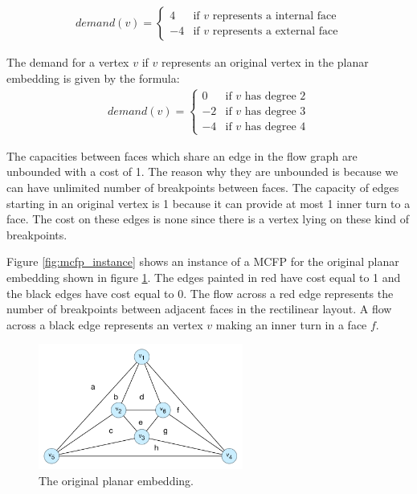 \documentclass[12pt]{article}
\begin{document}
\begin{align*}
    demand(v) = \begin{cases}
                  4  & \text{if } v \text{ represents a internal face}\\
                  -4 & \text{if } v \text{ represents a external face}
                \end{cases}
\end{align*}

The demand for a vertex $v$ if $v$ represents an original vertex in the planar embedding is given by the formula:
\begin{align*}
    demand(v) = \begin{cases}
                  0  & \text{if } v \text{ has degree 2} \\
                  -2 & \text{if } v \text{ has degree 3} \\
                  -4 & \text{if } v \text{ has degree 4}
                \end{cases}
\end{align*}

The capacities between faces which share an edge in the flow graph are unbounded with a cost of 1. The reason why they are unbounded is because we can have unlimited number of breakpoints between faces. The capacity of edges starting in an original vertex is 1 because it can provide at most 1 inner turn to a face. The cost on these edges is none since there is a vertex lying on these kind of breakpoints.

Figure \ref{fig:mcfp_instance} shows an instance of a MCFP for the original planar embedding shown in figure \ref{fig:planar_embedding}. The edges painted in red have cost equal to 1 and the black edges have cost equal to 0. The flow across a red edge represents the number of breakpoints between adjacent faces in the rectilinear layout. A flow across a black edge represents an vertex $v$ making an inner turn in a face $f$.

\begin{figure}[h]
  \centering
    \includegraphics[width=0.6\textwidth]{figures/e2_5_planar_embedding}
  \caption{The original planar embedding.}
  \label{fig:planar_embedding}
\end{figure}
\end{document}
